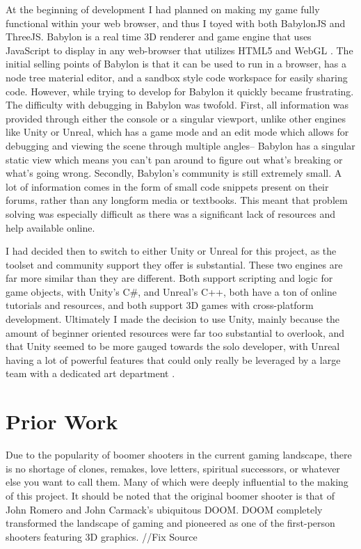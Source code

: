 \documentclass[10pt,twocolumn]{article}
\begin{document}
At the beginning of development I had planned on making my game fully functional within your web browser, and thus I toyed with both BabylonJS and ThreeJS. Babylon is a real time 3D renderer and game engine that uses JavaScript to display in any web-browser that utilizes HTML5 and WebGL \cite{BabylonSite}. The initial selling points of Babylon is that it can be used to run in a browser, has a node tree material editor, and a sandbox style code workspace for easily sharing code. However, while trying to develop for Babylon it quickly became frustrating. The difficulty with debugging in Babylon was twofold. First, all information was provided through either the console or a singular viewport, unlike other engines like Unity or Unreal, which has a game mode and an edit mode which allows for debugging and viewing the scene through multiple angles-- Babylon has a singular static view which means you can’t pan around to figure out what’s breaking or what’s going wrong. Secondly, Babylon’s community is still extremely small. A lot of information comes in the form of small code snippets present on their forums, rather than any longform media or textbooks. This meant that problem solving was especially difficult as there was a significant lack of resources and help available online. 


I had decided then to switch to either Unity or Unreal for this project, as the toolset and community support they offer is substantial. These two engines are far more similar than they are different. Both support scripting and logic for game objects, with Unity’s C\#, and Unreal’s C++, both have a ton of online tutorials and resources, and both support 3D games with cross-platform development. Ultimately I made the decision to use Unity, mainly because the amount of beginner oriented resources were far too substantial to overlook, and that Unity seemed to be more gauged towards the solo developer, with Unreal having a lot of powerful features that could only really be leveraged by a large team with a dedicated art department \cite{UdemyUnrealVUnity}.

\section{Prior Work}
Due to the popularity of boomer shooters in the current gaming landscape, there is no shortage of clones, remakes, love letters, spiritual successors, or whatever else  you want to call them. Many of which were deeply influential to the making of this project. 
It should be noted that the original boomer shooter is that of John Romero and John Carmack’s ubiquitous DOOM. DOOM completely transformed the landscape of gaming and pioneered as one of the first-person shooters featuring 3D graphics. //Fix Source
\end{document}
